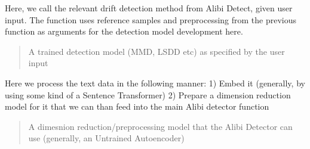 \documentclass[letterpaper,10pt,english]{sphinxmanual}
\begin{document}
\begin{fulllineitems}
\begin{fulllineitems}
\begin{quote}
\begin{description}
\begin{itemize}
\end{itemize}


\end{description}\end{quote}

\end{fulllineitems}


\begin{fulllineitems}
\label{\detokenize{alibiModules/onlineDetectors:onlineDetectors.onlineDetectors.detector}}
\pysigstartsignatures
{}
\pysigstopsignatures
\sphinxAtStartPar
Here, we call the relevant drift detection method from Alibi Detect, given user input.
The function uses reference samples and preprocessing from the previous function as arguments
for the detection model development here.
\begin{quote}\begin{description}
\sphinxAtStartPar
A trained detection model (MMD, LSDD etc) as specified by the user input

\end{description}\end{quote}

\end{fulllineitems}


\begin{fulllineitems}
\label{\detokenize{alibiModules/onlineDetectors:onlineDetectors.onlineDetectors.preprocess}}
\pysigstartsignatures
{}
\pysigstopsignatures
\sphinxAtStartPar
Here we process the text data in the following manner:
1) Embed it (generally, by using some kind of a Sentence Transformer)
2) Prepare a dimension reduction model for it that we can than feed into the main Alibi
detector function
\begin{quote}\begin{description}
\sphinxAtStartPar
A dimesnion reduction/preprocessing model that the Alibi Detector can use (generally, an Untrained Autoencoder)

\end{description}\end{quote}


\end{fulllineitems}
\end{fulllineitems}
\end{document}
